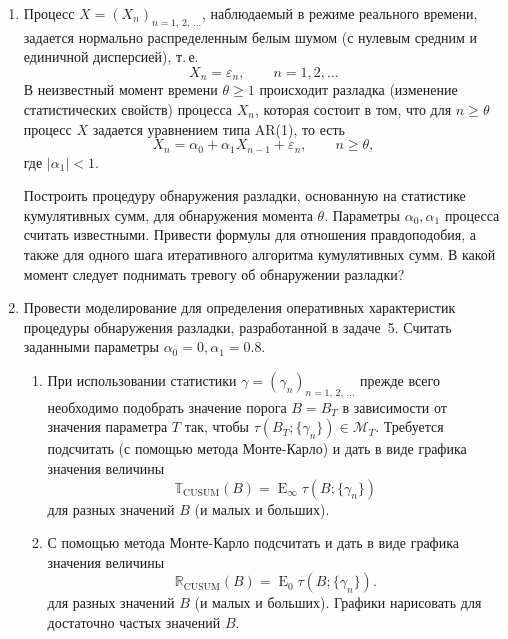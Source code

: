 \documentclass[a4paper,14pt]{extreport}
\renewcommand{\=}[1]{\stackrel{#1}{=}} %
\newcommand{\Expect}{\mathop{{}\mathrm{E}}}
\newcommand{\discretetime}{n = 1,\,2,\,\ldots}
\newcommand{\newprocessd}[1]{
    \ensuremath{
        #1 = \left(#1 _n\right)_{\discretetime}
    }
}
\begin{document}
\begin{enumerate}
    \item Процесс $\newprocessd{X}$, наблюдаемый
    в режиме реального времени, задается
    нормально распределенным белым шумом
    (с нулевым  средним и единичной дисперсией), 
    т.\,е. 
    \[
    X_n = \varepsilon_n, \qquad n=1, 2, \ldots
    \]
    В неизвестный момент времени $\theta \geqslant 1$
    происходит разладка 
    (изменение статистических свойств) процесса
    $X_n$, которая состоит в том, что 
    для $n \geqslant \theta$ процесс $X$
    задается уравнением типа AR(1), то есть
    \[
    X_n = \alpha_0 + \alpha_1 X_{n-1} + \varepsilon_n,
    \qquad n \geqslant \theta,
    \]
    где $|\alpha_1| < 1$. 

    Построить процедуру обнаружения
    разладки, основанную на статистике кумулятивных
    сумм, для обнаружения момента $\theta$.
    Параметры $\alpha_0, \alpha_1$
    процесса считать известными. 
    Привести формулы для отношения правдоподобия,
    а также для одного шага итеративного алгоритма
    кумулятивных сумм. В какой момент
    следует поднимать тревогу об обнаружении разладки?

    \item Провести моделирование для определения
    оперативных характеристик процедуры обнаружения
    разладки, разработанной в задаче~5. Считать
    заданными параметры $\alpha_0 = 0, \alpha_1 = 0.8$.
    \begin{enumerate}
        \item При использовании статистики 
        $\newprocessd{\gamma}$ прежде
        всего необходимо подобрать
        значение порога $B = B_T$ в зависимости
        от значения параметра $T$ так, чтобы
        $\tau (B_T ; \{\gamma_n\}) \in \mathcal{M}_T$.
        Требуется подсчитать (с помощью метода
        Монте-Карло) и дать в виде графика
        значения величины
        \[
        \mathbb{T}_{\mathrm{CUSUM}}(B) = 
        {\textstyle \Expect_{\infty}} \tau(B; \{\gamma_n\})
        \]
        для разных значений $B$ (и малых и больших).

        \item С помощью метода Монте-Карло подсчитать
        и дать в виде графика значения величины
        \[
        \mathbb{R}_{\text{CUSUM}}(B) = 
        {\textstyle \Expect_{0}} \tau(B; \{\gamma_n\}).
        \]
        для разных значений $B$ (и малых и больших). Графики нарисовать для достаточно
        частых значений $B$.

    \end{enumerate}


\end{enumerate}
\end{document}
